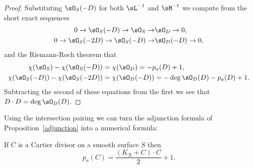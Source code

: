 \begin{proof}
Substituting $\sO_{S}(-D)$ for both $\sL^{-1}$ and $\sM^{-1}$ we compute from the short exact sequences
\begin{align*}
 0\to \sO_{S}(-D)\to \sO_{S}\to &\sO_{D}\to 0,\\
0\to \sO_{S}(-2D)\to \sO_{S}(-D)\to &\sO_{D}(-D)\to 0,
\end{align*}
and the Riemann-Roch theorem that
\begin{align*}
\chi(\sO_{S}) -\chi(\sO_{S}(-D)) &= \chi(\sO_{D}) = -p_{a}(D) +1,\\
\chi(\sO_{S}(-D)) -\chi(\sO_{S}(-2D)) &= \chi(\sO_{D}(-D)) = -\deg \sO_{D}(D) - p_{a}(D) +1.\\
\end{align*}
Subtracting the second of these equations from the first we see that
$D\cdot D = \deg \sO_{D}(D)$.
\end{proof}

Using the intersection pairing we can turn the adjunction formula of Proposition~\ref{adjunction} into a numerical formula:

\begin{theorem}\label{adjunction formula} 
If $C$ is a Cartier divisor on a smooth surface $S$ then\label{genus formula}
$$
p_a(C) = \frac{(K_X+C)\cdot C}{2} +1.
 $$
\end{theorem}

%
%




